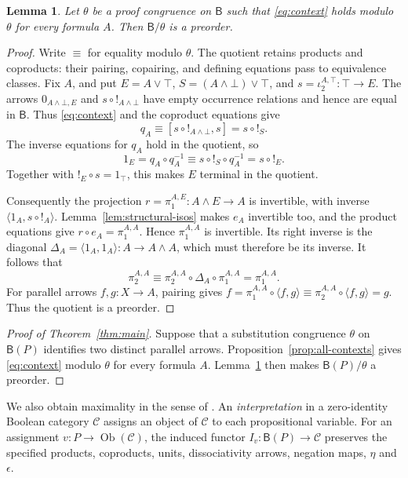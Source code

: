 \documentclass[11pt]{article}
\newtheorem{lemma}[theorem]{Lemma}
\newcommand{\B}{\mathsf B}
\begin{document}
\begin{lemma}\label{lem:collapse}
Let $\theta$ be a proof congruence on $\B$ such that
\eqref{eq:context} holds modulo $\theta$ for every formula $A$.
Then $\B/\theta$ is a preorder.
\end{lemma}

\begin{proof}
Write $\equiv$ for equality modulo $\theta$.
The quotient retains products and coproducts: their pairing,
copairing, and defining equations pass to equivalence classes.
Fix $A$, and put
$E=A\vee\top$, $S=(A\wedge\bot)\vee\top$, and
$s=\iota_2^{A,\top}:\top\to E$.
The arrows $0_{A\wedge\bot,E}$ and $s\circ!_{A\wedge\bot}$ have
empty occurrence relations and hence are equal in $\B$. Thus
\eqref{eq:context} and the coproduct equations give
\[
 q_A\equiv[s\circ!_{A\wedge\bot},s]=s\circ!_S.
\]
The inverse equations for $q_A$ hold in the quotient, so
\[
 1_E=q_A\circ q_A^{-1}
    \equiv s\circ!_S\circ q_A^{-1}=s\circ!_E.
\]
Together with $!_E\circ s=1_\top$, this makes $E$ terminal in the
quotient.

Consequently the projection
$r=\pi_1^{A,E}:A\wedge E\to A$ is invertible, with inverse
$\langle1_A,s\circ!_A\rangle$.
Lemma~\ref{lem:structural-isos} makes $e_A$ invertible too, and the
product equations give
$r\circ e_A=\pi_1^{A,A}$.
Hence $\pi_1^{A,A}$ is invertible. Its right inverse is the diagonal
$\Delta_A=\langle1_A,1_A\rangle:A\to A\wedge A$, which must
therefore be its inverse. It follows that
\[
 \pi_2^{A,A}
   \equiv\pi_2^{A,A}\circ\Delta_A\circ\pi_1^{A,A}
   =\pi_1^{A,A}.
\]
For parallel arrows $f,g:X\to A$, pairing gives
$f=\pi_1^{A,A}\circ\langle f,g\rangle
 \equiv\pi_2^{A,A}\circ\langle f,g\rangle=g$.
Thus the quotient is a preorder.
\end{proof}

\begin{proof}[Proof of Theorem~\ref{thm:main}]
Suppose that a substitution congruence $\theta$ on $\B(P)$ identifies
two distinct parallel arrows. Proposition~\ref{prop:all-contexts}
gives \eqref{eq:context} modulo $\theta$ for every formula $A$.
Lemma~\ref{lem:collapse} then makes $\B(P)/\theta$ a preorder.
\end{proof}

We also obtain maximality in the sense of
\cite[\S9.3, p.~194]{DP}. An \emph{interpretation} in a zero-identity
Boolean category $\mathcal C$ assigns an object of $\mathcal C$ to
each propositional variable. For an assignment
$v:P\to\operatorname{Ob}(\mathcal C)$, the induced functor
$I_v:\B(P)\to\mathcal C$ preserves the specified products, coproducts,
units, dissociativity arrows, negation maps, $\eta$ and $\epsilon$.
\end{document}
